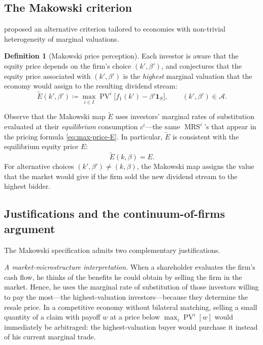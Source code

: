 \documentclass[11pt,a4paper,oneside]{book}
\def\1{\mathbf{1}}
\DeclareMathOperator{\MRS}{MRS}
\DeclareMathOperator{\PV}{PV}
\theoremstyle{plain}
\theoremstyle{definition}
\newtheorem{definition}[theorem]{Definition}
\theoremstyle{remark}
\numberwithin{equation}{chapter}
\begin{document}
\subsection{The Makowski criterion}

\citet{Makowski1983b} proposed an alternative criterion tailored to economies with non-trivial heterogeneity of marginal valuations.

\begin{definition}[Makowski price perception]\label{def:makowski}
Each investor is aware that the equity price depends on the firm's choice $(k', \beta')$, and conjectures that the equity price associated with $(k', \beta')$ is the \emph{highest} marginal valuation that the economy would assign to the resulting dividend stream:
\begin{equation}\label{eq:makowski}
  \widetilde{E}(k', \beta') \coloneqq \max_{i \in I} \PV^i\bigl[ f_1(k') - \beta' \1_S \bigr],
  \qquad (k', \beta') \in \mathcal{A}.
\end{equation}
\end{definition}

Observe that the Makowski map $\widetilde{E}$ uses investors' marginal rates of substitution evaluated at their \emph{equilibrium} consumption $c^i$---the same $\MRS^i$'s that appear in the pricing formula \eqref{eq:max-price-E}.
In particular, $\widetilde{E}$ is consistent with the equilibrium equity price $E$:
\begin{equation*}
  \widetilde{E}(k, \beta) = E.
\end{equation*}
For alternative choices $(k', \beta') \neq (k, \beta)$, the Makowski map assigns the value that the market would give if the firm sold the new dividend stream to the highest bidder.

\subsection{Justifications and the continuum-of-firms argument}
\label{sec:makowski-justification}

The Makowski specification admits two complementary justifications.

\emph{A market-microstructure interpretation.}
When a shareholder evaluates the firm's cash flow, he thinks of the benefits he could obtain by selling the firm in the market.
Hence, he uses the marginal rate of substitution of those investors willing to pay the most---the highest-valuation investors---because they determine the resale price.
In a competitive economy without bilateral matching, selling a small quantity of a claim with payoff $w$ at a price below $\max_i \PV^i[w]$ would immediately be arbitraged: the highest-valuation buyer would purchase it instead of his current marginal trade.
\end{document}
